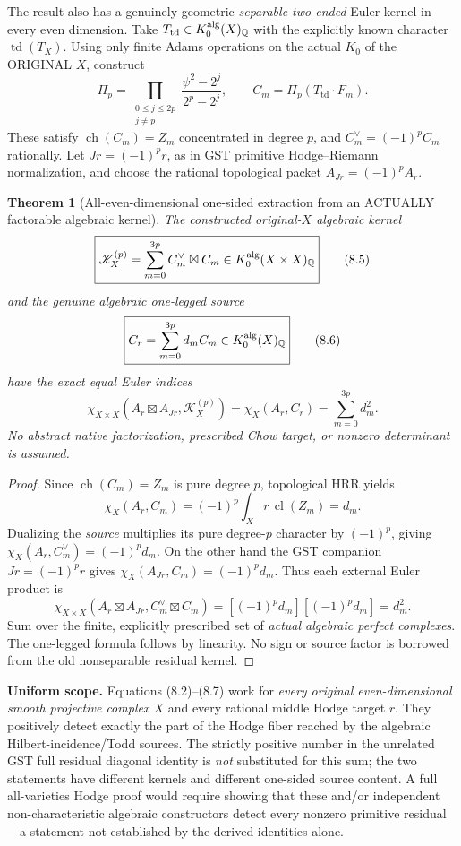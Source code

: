 \documentclass[11pt]{article}
\newcommand{\Q}{\mathbb Q}
\newcommand{\ch}{\operatorname{ch}}
\newcommand{\td}{\operatorname{td}}
\newcommand{\cl}{\operatorname{cl}}
\newtheorem{theorem}{Theorem}[section]
\begin{document}
The result also has a genuinely geometric
\emph{separable two-ended} Euler kernel in every
even dimension. Take \(T_{\td}\in K_0^{\rm alg}(X)_\Q\)
with the explicitly known character \(\td(T_X)\).
Using only finite Adams operations on the actual \(K_0\)
of the ORIGINAL \(X\), construct
\[
 \Pi_p=\prod_{\substack{0\le j\le2p\\j\ne p}}
                 \frac{\psi^2-2^j}{2^p-2^j},
 \qquad
 C_m=\Pi_p(T_{\td}\cdot F_m).
                                                               \tag{8.4}
\]
These satisfy \(\ch(C_m)=Z_m\) concentrated in degree
\(p\), and \(C_m^\vee=(-1)^p C_m\) rationally. Let
\(Jr=(-1)^p r\), as in GST primitive Hodge--Riemann
normalization, and choose the rational topological packet
\(A_{Jr}=(-1)^pA_r\).

\begin{theorem}[All-even-dimensional one-sided extraction from an ACTUALLY factorable algebraic kernel]
The constructed original-\(X\) algebraic kernel
\[
 \boxed{\mathscr K^{(p)}_X=
    \sum_{m=0}^{3p}C_m^\vee\boxtimes C_m
       \in K_0^{\rm alg}(X\times X)_\Q}             \tag{8.5}
\]
and the \emph{genuine algebraic one-legged source}
\[
 \boxed{C_r=\sum_{m=0}^{3p}d_m C_m
                 \in K_0^{\rm alg}(X)_\Q}          \tag{8.6}
\]
have the exact equal Euler indices
\[
 \boxed{\chi_{X\times X}
   (A_r\boxtimes A_{Jr},\mathscr K^{(p)}_X)
      =\chi_X(A_r,C_r)
      =\sum_{m=0}^{3p}d_m^2.}                     \tag{8.7}
\]
No abstract native factorization, prescribed Chow target,
or nonzero determinant is assumed.
\end{theorem}
\begin{proof}
Since \(\ch(C_m)=Z_m\) is pure degree \(p\),
topological HRR yields
\[
 \chi_X(A_r,C_m)=(-1)^p\int_Xr\,\cl(Z_m)=d_m.
\]
Dualizing the \emph{source} multiplies its pure degree-\(p\)
character by \((-1)^p\), giving
\(\chi_X(A_r,C_m^\vee)=(-1)^p d_m\).
On the other hand the GST companion \(Jr=(-1)^pr\)
gives
\(\chi_X(A_{Jr},C_m)=(-1)^p d_m\).
Thus each external Euler product is
\[
 \chi_{X\times X}
   (A_r\boxtimes A_{Jr},C_m^\vee\boxtimes C_m)
     =[(-1)^p d_m][(-1)^p d_m]=d_m^2.
\]
Sum over the finite, explicitly prescribed set of
\emph{actual algebraic perfect complexes}.
The one-legged formula follows by linearity.
No sign or source factor is borrowed from the
old nonseparable residual kernel.
\end{proof}

\noindent\textbf{Uniform scope.} Equations (8.2)--(8.7)
work for \emph{every original even-dimensional smooth
projective complex \(X\)} and every rational middle
Hodge target \(r\). They positively detect exactly
the part of the Hodge fiber reached by the algebraic
Hilbert-incidence/Todd sources. The strictly positive
number in the unrelated GST full residual diagonal
identity is \emph{not} substituted for this sum; the
two statements have different kernels and different
one-sided source content. A full all-varieties
Hodge proof would require showing that these
and/or independent non-characteristic algebraic
constructors detect every nonzero primitive
residual---a statement not established by the
derived identities alone.
\end{document}
